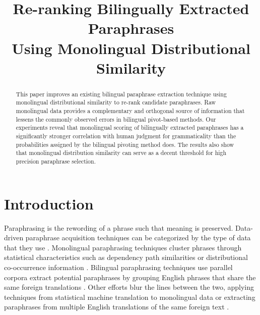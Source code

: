 \documentclass[11pt]{article}
\title{Re-ranking Bilingually Extracted Paraphrases \\ Using Monolingual Distributional Similarity}
\date{}
\newcommand{\mnote}[1]{\marginpar{\raggedleft\footnotesize\itshape#1}}
\begin{document}
\maketitle
\begin{abstract}
\vspace{-.2cm}
This paper improves an existing bilingual paraphrase extraction technique using monolingual distributional similarity to re-rank candidate paraphrases.  Raw monolingual data  provides a complementary and orthogonal source of information that lessens the commonly observed errors in bilingual pivot-based methods. %
Our experiments reveal that monolingual scoring of bilingually extracted paraphrases has a significantly stronger correlation with human judgment for grammaticality than the probabilities assigned by the bilingual pivoting method does. The results also show that monolingual distribution similarity can serve as a decent threshold for high precision paraphrase selection.


\end{abstract} 


\vspace{-.25cm}
\section{Introduction}
Paraphrasing is the rewording of a phrase such that meaning is preserved. Data-driven paraphrase acquisition techniques can be categorized by the type of data that they use \cite{MadnaniDorr10}.  Monolingual paraphrasing techniques cluster phrases through statistical characteristics such as dependency path similarities or distributional co-occurrence information \cite{Lin01discoveryof,PascaDienes05}.   Bilingual paraphrasing techniques use parallel corpora extract potential paraphrases by grouping English phrases that share the same foreign translations \cite{BannardCallisonBurch05}.  Other efforts blur the lines between the two, applying techniques from statistical machine translation to monolingual data or extracting paraphrases from multiple English translations of the same foreign text \cite{Barzilay2001,PangEtAl03,QuirkDolanBrockett04}.
\end{document}
